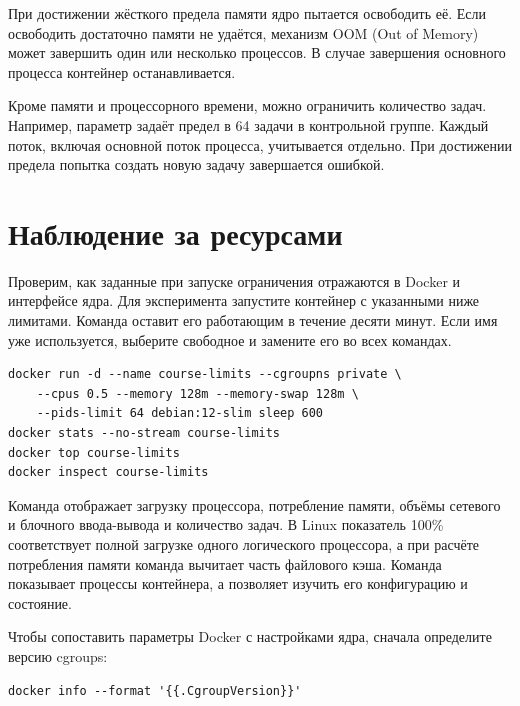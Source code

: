 При достижении жёсткого предела памяти ядро пытается освободить её. Если освободить достаточно памяти не удаётся, механизм OOM (Out of Memory) может завершить один или несколько процессов. В случае завершения основного процесса контейнер останавливается.

Кроме памяти и процессорного времени, можно ограничить количество задач. Например, параметр  задаёт предел в 64 задачи в контрольной группе. Каждый поток, включая основной поток процесса, учитывается отдельно. При достижении предела попытка создать новую задачу завершается ошибкой.

\section{Наблюдение за ресурсами}

Проверим, как заданные при запуске ограничения отражаются в Docker и интерфейсе ядра. Для эксперимента запустите контейнер с указанными ниже лимитами. Команда  оставит его работающим в течение десяти минут. Если имя  уже используется, выберите свободное и замените его во всех командах.
\par\addvspace{10pt}\noindent\begin{minipage}{\linewidth}
\begin{verbatim}
docker run -d --name course-limits --cgroupns private \
    --cpus 0.5 --memory 128m --memory-swap 128m \
    --pids-limit 64 debian:12-slim sleep 600
docker stats --no-stream course-limits
docker top course-limits
docker inspect course-limits
\end{verbatim}
\end{minipage}\par\addvspace{10pt}

Команда  отображает загрузку процессора, потребление памяти, объёмы сетевого и блочного ввода-вывода и количество задач. В Linux показатель 100\% соответствует полной загрузке одного логического процессора, а при расчёте потребления памяти команда вычитает часть файлового кэша. Команда  показывает процессы контейнера, а  позволяет изучить его конфигурацию и состояние.

\par\addvspace{10pt}\noindent\begin{minipage}{\linewidth}
\setlength{\parindent}{0pt}\noindent\hspace*{1.25cm}Чтобы сопоставить параметры Docker с настройками ядра, сначала определите версию cgroups:\par\kern 10pt
\begin{verbatim}
docker info --format '{{.CgroupVersion}}'
\end{verbatim}
\end{minipage}\par\addvspace{10pt}


